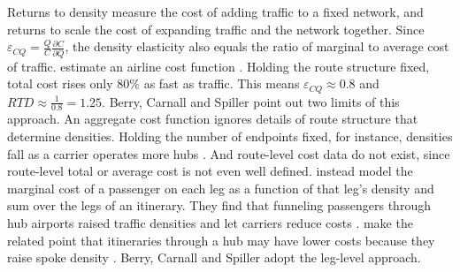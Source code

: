 Returns to density measure the cost of adding traffic to a fixed network, and returns to scale the cost
of expanding traffic and the network together. Since $\varepsilon_{CQ}=\frac{Q}{C}\frac{\partial C}{\partial Q}$, the density elasticity also equals the ratio of marginal to average cost of traffic.
\citet{CavesChristensenTretheway1984} estimate an airline cost function \citep[p.~4]{BerryCarnallSpiller2006}.
Holding the route structure fixed, total cost rises only 80\% as fast as traffic. This means $\varepsilon_{CQ}\approx0.8$ and
$RTD\approx\frac{1}{0.8}=1.25$. Berry, Carnall and Spiller point out two limits of this approach. An
aggregate cost function ignores details of route structure that determine densities. Holding the number
of endpoints fixed, for instance, densities fall as a carrier operates more hubs
\citep[p.~4, n.~7]{BerryCarnallSpiller2006}. And route-level cost data do not exist, since route-level
total or average cost is not even well defined. \citet{BruecknerSpiller1994} instead model the marginal
cost of a passenger on each leg as a function of that leg's density and sum over the legs of an
itinerary. They find that funneling passengers through hub airports raised traffic densities and let
carriers reduce costs \citep[pp.~4--5]{BerryCarnallSpiller2006}. \citet{BruecknerDyerSpiller1992} make
the related point that itineraries through a hub may have lower costs because they raise spoke density
\citep[p.~2]{BerryCarnallSpiller2006}. Berry, Carnall and Spiller adopt the leg-level approach.

